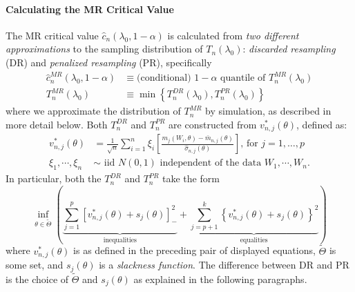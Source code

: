 \documentclass[12pt]{article}
\begin{document}
\paragraph{Calculating the MR Critical Value}
The MR critical value $\widehat{c}_n(\lambda_0, 1 - \alpha)$ is calculated from \emph{two different approximations} to the sampling distribution of $T_n(\lambda_0)$: \emph{discarded resampling} (DR) and \emph{penalized resampling} (PR), specifically
\begin{align*}
  \widehat{c}_n^{MR}(\lambda_0, 1 - \alpha) &\equiv \mbox{(conditional) } 1 - \alpha \mbox{ quantile of } T_n^{MR}(\lambda_0) \\
  T_n^{MR}(\lambda_0) &\equiv \min\left\{ T_n^{DR}(\lambda_0), T_n^{PR}(\lambda_0) \right\}
\end{align*}
where we approximate the distribution of $T_n^{MR}$ by simulation, as described in more detail below.
Both $T_n^{DR}$ and $T_n^{PR}$ are constructed from $v^*_{n,j}(\theta)$, defined as: 
\begin{align*}
  v^*_{n,j}(\theta) &= \frac{1}{\sqrt{n}} \sum_{i=1}^{n} \xi_i \left[ \frac{m_j(W_i,\theta) - \bar{m}_{n,j}(\theta)}{\widehat{\sigma}_{n,j}(\theta)} \right], \, \mbox{for } j = 1, \hdots, p \\
  \xi_1, \cdots, \xi_n &\sim \mbox{ iid } N(0,1) \mbox{ independent of the data } W_1, \cdots, W_n.
\end{align*}
In particular, both the $T_n^{DR}$ and $T_{n}^{PR}$ take the form
\[
  \inf_{\theta \in \widetilde{\Theta}}\left(\underbrace{\sum_{j=1}^p \left[ v_{n,j}^*(\theta) + s_j(\theta) \right]_{-}^2}_{\text{inequalities}} + \underbrace{\sum_{j=p+1}^{k}\left\{   v^*_{n,j}(\theta) + s_j(\theta)\right\}^2}_{\text{equalities}}  \right)
\]
where $v^*_{n,j}(\theta)$ is as defined in the preceding pair of displayed equations, $\widetilde{\Theta}$ is some set, and $s_j(\theta)$ is a \emph{slackness function}.
The difference between DR and PR is the choice of $\widetilde{\Theta}$ and $s_j(\theta)$ as explained in the following paragraphs.
\end{document}
